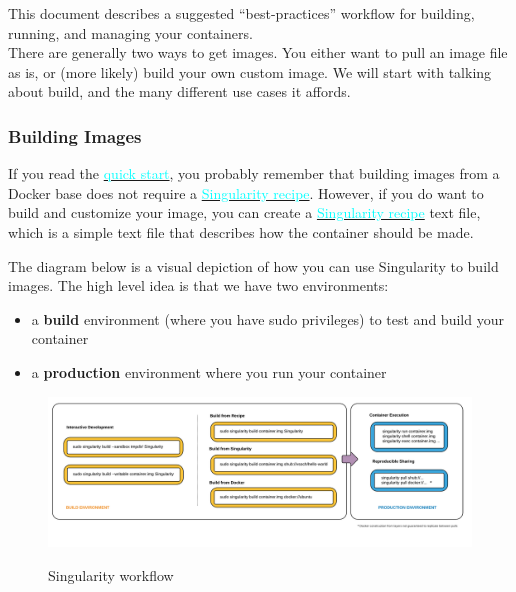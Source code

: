 \documentclass[a4paper]{article}
\newcounter{subsubsubsection}[subsubsection]
\begin{document}
This document describes a suggested “best-practices” workflow for building, running, and managing your containers.\\[0.1in]
There are generally two ways to get images. You either want to pull an image file as is, or (more likely) build your own custom image. We will start with talking about build, and the many different use cases it affords.


\label{sec:singularityflow}
\subsubsection{Building Images}

If you read the \hyperref[sec:quickstart]{{\textcolor{cyan}{quick start}}}, you probably remember that building images from a Docker base does not require a \hyperref[sec:recipefile]{{\textcolor{cyan}{Singularity recipe}}}. However, if you do want to build and customize your image, you can create a \hyperref[sec:recipefile]{{\textcolor{cyan}{Singularity recipe}}} text file, which is a simple text file that describes how the container should be made.\\[0.1in]


	The diagram below is a visual depiction of how you can use Singularity to build images. The high level idea is that we have two environments:
	
	\begin{itemize}
	\item a \textbf{build} environment (where you have sudo privileges) to test and build your container
	\item a \textbf{production} environment where you run your container
\end{itemize}

\begin{figure}[h]
\centering
{\includegraphics{flow.png}}
\caption{Singularity workflow}
\end{figure}
\end{document}
